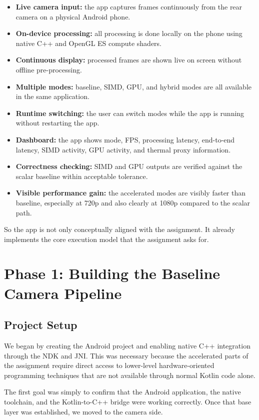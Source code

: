 \documentclass[12pt,a4paper]{article}
\begin{document}
\begin{itemize}
\item \textbf{Live camera input:} the app captures frames continuously from the rear camera on a physical Android phone.
\item \textbf{On-device processing:} all processing is done locally on the phone using native C++ and OpenGL ES compute shaders.
\item \textbf{Continuous display:} processed frames are shown live on screen without offline pre-processing.
\item \textbf{Multiple modes:} baseline, SIMD, GPU, and hybrid modes are all available in the same application.
\item \textbf{Runtime switching:} the user can switch modes while the app is running without restarting the app.
\item \textbf{Dashboard:} the app shows mode, FPS, processing latency, end-to-end latency, SIMD activity, GPU activity, and thermal proxy information.
\item \textbf{Correctness checking:} SIMD and GPU outputs are verified against the scalar baseline within acceptable tolerance.
\item \textbf{Visible performance gain:} the accelerated modes are visibly faster than baseline, especially at 720p and also clearly at 1080p compared to the scalar path.
\end{itemize}

So the app is not only conceptually aligned with the assignment. It already implements the core execution model that the assignment asks for.

\section{Phase 1: Building the Baseline Camera Pipeline}

\subsection{Project Setup}

We began by creating the Android project and enabling native C++ integration through the NDK and JNI. This was necessary because the accelerated parts of the assignment require direct access to lower-level hardware-oriented programming techniques that are not available through normal Kotlin code alone.

The first goal was simply to confirm that the Android application, the native toolchain, and the Kotlin-to-C++ bridge were working correctly. Once that base layer was established, we moved to the camera side.
\end{document}
